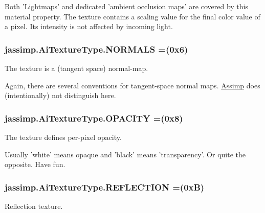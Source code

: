 Both 'Lightmaps' and dedicated 'ambient occlusion maps' are covered by this material property. The texture contains a scaling value for the final color value of a pixel. Its intensity is not affected by incoming light. \hypertarget{enumjassimp_1_1_ai_texture_type_ae458458e68ca6abaa1b14057b139aead}{
\subsubsection[{N\+O\+R\+M\+A\+L\+S}]{\setlength{\rightskip}{0pt plus 5cm}jassimp.\+Ai\+Texture\+Type.\+N\+O\+R\+M\+A\+L\+S =(0x6)}}\label{enumjassimp_1_1_ai_texture_type_ae458458e68ca6abaa1b14057b139aead}
The texture is a (tangent space) normal-\/map.

Again, there are several conventions for tangent-\/space normal maps. \hyperlink{class_assimp}{Assimp} does (intentionally) not distinguish here. \hypertarget{enumjassimp_1_1_ai_texture_type_a87749b5be55335a4bd408daae1ef16df}{
\subsubsection[{O\+P\+A\+C\+I\+T\+Y}]{\setlength{\rightskip}{0pt plus 5cm}jassimp.\+Ai\+Texture\+Type.\+O\+P\+A\+C\+I\+T\+Y =(0x8)}}\label{enumjassimp_1_1_ai_texture_type_a87749b5be55335a4bd408daae1ef16df}
The texture defines per-\/pixel opacity.

Usually 'white' means opaque and 'black' means 'transparency'. Or quite the opposite. Have fun. \hypertarget{enumjassimp_1_1_ai_texture_type_a1895e31625c8dd581b370692dfd1b6bd}{
\subsubsection[{R\+E\+F\+L\+E\+C\+T\+I\+O\+N}]{\setlength{\rightskip}{0pt plus 5cm}jassimp.\+Ai\+Texture\+Type.\+R\+E\+F\+L\+E\+C\+T\+I\+O\+N =(0x\+B)}}\label{enumjassimp_1_1_ai_texture_type_a1895e31625c8dd581b370692dfd1b6bd}
Reflection texture.

